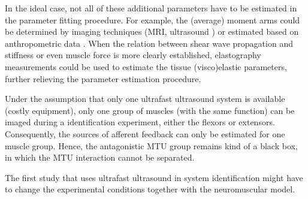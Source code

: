 In the ideal case, not all of these additional parameters have to be estimated in the parameter fitting procedure. For example, the (average) moment arms could be determined by imaging techniques (MRI, ultrasound \cite{fath_direct_2010}) or estimated based on anthropometric data \cite{ramsay_muscle_2009}. When the relation between shear wave propagation and stiffness or even muscle force is more clearly established, elastography measurements could be used to estimate the tissue (visco)elastic parameters, further relieving the parameter estimation procedure. 

Under the assumption that only one ultrafast ultrasound system is available (costly equipment), only one group of muscles (with the same function) can be imaged during a identification experiment, either the flexors or extensors. Consequently, the sources of afferent feedback can only be estimated for one muscle group. Hence, the antagonistic MTU group remains kind of a black box, in which the MTU interaction cannot be separated. 

The first study that uses ultrafast ultrasound in system identification might have to change the experimental conditions together with the neuromuscular model. 





